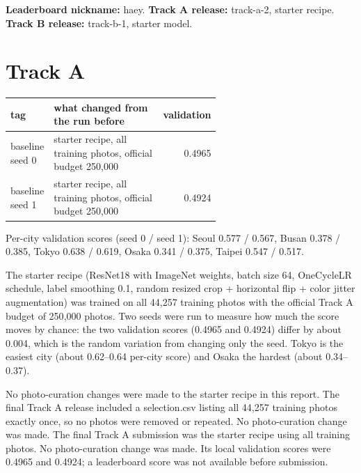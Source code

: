 \documentclass[11pt]{article}
\begin{document}
\makeheader

\textbf{Leaderboard nickname:} haey. \textbf{Track A release:} track-a-2, starter recipe. \textbf{Track B release:} track-b-1, starter model.


\section*{Track A}

\begin{center}\footnotesize
\begin{tabular}{lp{0.6\linewidth}r}
\toprule
tag & what changed from the run before & validation \\
\midrule
baseline seed 0 & starter recipe, all training photos, official budget 250{,}000 & 0.4965 \\
baseline seed 1 & starter recipe, all training photos, official budget 250{,}000 & 0.4924 \\
\bottomrule
\end{tabular}
\end{center}

Per-city validation scores (seed 0 / seed 1): Seoul 0.577 / 0.567, Busan
0.378 / 0.385, Tokyo 0.638 / 0.619, Osaka 0.341 / 0.375, Taipei 0.547 / 0.517.

The starter recipe (ResNet18 with ImageNet weights, batch size 64, OneCycleLR
schedule, label smoothing 0.1, random resized crop + horizontal flip + color
jitter augmentation) was trained on all 44{,}257 training photos with the
official Track A budget of 250{,}000 photos. Two seeds were run to measure
how much the score moves by chance: the two validation scores (0.4965 and
0.4924) differ by about 0.004, which is the random variation from changing
only the seed. Tokyo is the easiest city (about 0.62--0.64 per-city score)
and Osaka the hardest (about 0.34--0.37).

No photo-curation changes were made to the starter recipe in this report.
The final Track A release included a selection.csv listing all 44,257 training photos exactly once, so no photos were removed or repeated. No photo-curation change was made.
The final Track A submission was the starter recipe using all training photos. No photo-curation change was made. Its local validation scores were 0.4965 and 0.4924; a leaderboard score was not available before submission.
\end{document}
